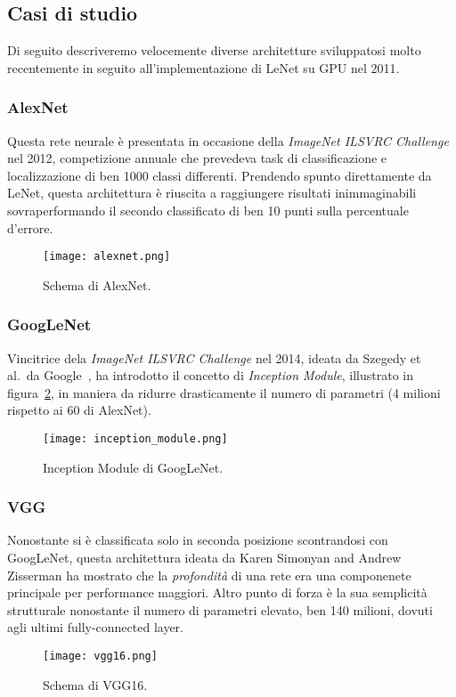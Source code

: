 \subsection{Casi di studio}
\label{subsec:case_studies}
Di seguito descriveremo velocemente diverse architetture sviluppatosi molto recentemente in seguito all'implementazione di LeNet su GPU nel 2011.\cite{gpu2011}

\subsubsection{AlexNet}
Questa rete neurale\cite{alexnet} è presentata in occasione della \textit{ImageNet ILSVRC Challenge}\cite{ILSVRC15} nel 2012, competizione annuale che prevedeva task di classificazione e localizzazione di ben 1000 classi differenti. Prendendo spunto direttamente da LeNet, questa architettura è riuscita a raggiungere risultati inimmaginabili sovraperformando il secondo classificato di ben 10 punti sulla percentuale d'errore.
\vfill
\begin{figure}[H]
	\centering
	\texttt{[image: alexnet.png]}
	\caption{Schema di AlexNet.}
\label{fig:alexnet}
\end{figure}
\vfill
\subsubsection{GoogLeNet}
Vincitrice dela \textit{ImageNet ILSVRC Challenge} nel 2014, ideata da Szegedy et al.\ da Google~\cite{googlenet}, ha introdotto il concetto di \textit{Inception Module}, illustrato in figura~\ref{fig:inception}, in maniera da ridurre drasticamente il numero di parametri (4 milioni rispetto ai 60 di AlexNet).

\begin{figure}[H]
	\centering
	\texttt{[image: inception\_module.png]}
	\caption{Inception Module di GoogLeNet.}
\label{fig:inception}
\end{figure}

\subsubsection{VGG}
Nonostante si è classificata solo in seconda posizione scontrandosi con GoogLeNet, questa architettura ideata da Karen Simonyan and Andrew Zisserman\cite{VGG} ha mostrato che la \textit{profondità} di una rete era una componenete principale per performance maggiori. Altro punto di forza è la sua semplicità strutturale nonostante il numero di parametri elevato, ben 140 milioni, dovuti agli ultimi fully-connected layer.
\begin{figure}[H]
	\centering
	\texttt{[image: vgg16.png]}
	\caption{Schema di VGG16.}
\label{fig:vgg16}
\end{figure}

